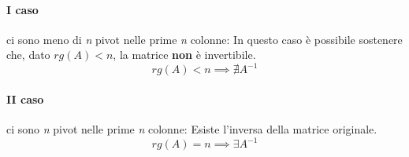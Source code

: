 				\paragraph{I caso} ci sono meno di \textit{n} pivot nelle prime \textit{n} colonne: \newline
				In questo caso è possibile sostenere che, dato $rg(A) < n$, la matrice \textbf{non} è invertibile.
				$$ rg(A) < n \implies \nexists A^{-1} $$
				
				\paragraph{II caso} ci sono \textit{n} pivot nelle prime \textit{n} colonne: \newline
				Esiste l'inversa della matrice originale.
				$$ rg(A) = n \implies \exists A^{-1} $$
